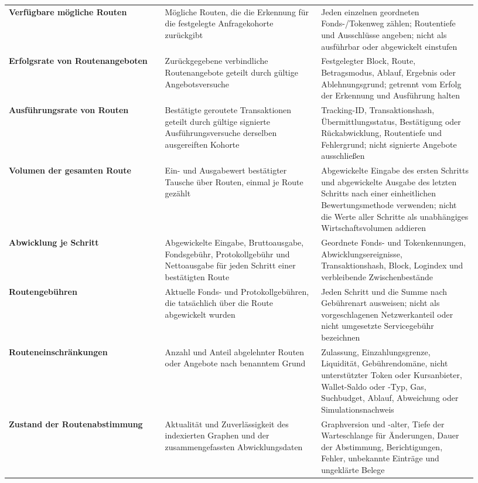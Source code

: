 \documentclass[11pt]{article}
\begin{document}
\begin{longtable}{P{0.31\linewidth} P{0.31\linewidth} P{0.31\linewidth}}
\textbf{Verfügbare mögliche Routen} & Mögliche Routen, die die Erkennung für die festgelegte Anfragekohorte zurückgibt & Jeden einzelnen geordneten Fonds-/Tokenweg zählen; Routentiefe und Ausschlüsse angeben; nicht als ausführbar oder abgewickelt einstufen \\
\textbf{Erfolgsrate von Routenangeboten} & Zurückgegebene verbindliche Routenangebote geteilt durch gültige Angebotsversuche & Festgelegter Block, Route, Betragsmodus, Ablauf, Ergebnis oder Ablehnungsgrund; getrennt vom Erfolg der Erkennung und Ausführung halten \\
\textbf{Ausführungsrate von Routen} & Bestätigte geroutete Transaktionen geteilt durch gültige signierte Ausführungsversuche derselben ausgereiften Kohorte & Tracking-ID, Transaktionshash, Übermittlungsstatus, Bestätigung oder Rückabwicklung, Routentiefe und Fehlergrund; nicht signierte Angebote ausschließen \\
\textbf{Volumen der gesamten Route} & Ein- und Ausgabewert bestätigter Tausche über Routen, einmal je Route gezählt & Abgewickelte Eingabe des ersten Schritts und abgewickelte Ausgabe des letzten Schritts nach einer einheitlichen Bewertungsmethode verwenden; nicht die Werte aller Schritte als unabhängiges Wirtschaftsvolumen addieren \\
\textbf{Abwicklung je Schritt} & Abgewickelte Eingabe, Bruttoausgabe, Fondsgebühr, Protokollgebühr und Nettoausgabe für jeden Schritt einer bestätigten Route & Geordnete Fonds- und Tokenkennungen, Abwicklungsereignisse, Transaktionshash, Block, Logindex und verbleibende Zwischenbestände \\
\textbf{Routengebühren} & Aktuelle Fonds- und Protokollgebühren, die tatsächlich über die Route abgewickelt wurden & Jeden Schritt und die Summe nach Gebührenart ausweisen; nicht als vorgeschlagenen Netzwerkanteil oder nicht umgesetzte Servicegebühr bezeichnen \\
\textbf{Routeneinschränkungen} & Anzahl und Anteil abgelehnter Routen oder Angebote nach benanntem Grund & Zulassung, Einzahlungsgrenze, Liquidität, Gebührendomäne, nicht unterstützter Token oder Kursanbieter, Wallet-Saldo oder -Typ, Gas, Suchbudget, Ablauf, Abweichung oder Simulationsnachweis \\
\textbf{Zustand der Routenabstimmung} & Aktualität und Zuverlässigkeit des indexierten Graphen und der zusammengefassten Abwicklungsdaten & Graphversion und -alter, Tiefe der Warteschlange für Änderungen, Dauer der Abstimmung, Berichtigungen, Fehler, unbekannte Einträge und ungeklärte Belege \\

\end{longtable}
\end{document}
